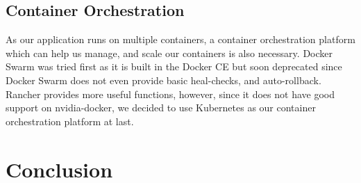 \documentclass[runningheads]{llncs}
\begin{document}
\subsection{Container Orchestration}
As our application runs on multiple containers, a container 
orchestration platform which can help us manage, and scale 
our containers is also necessary. Docker Swarm was tried 
first as it is built in the Docker CE but soon deprecated 
since Docker Swarm does not even provide basic heal-checks, 
and auto-rollback. Rancher provides more useful functions, 
however, since it does not have good support on 
nvidia-docker, we decided to use Kubernetes as our 
container orchestration platform at last.


\section{Conclusion}
\end{document}
